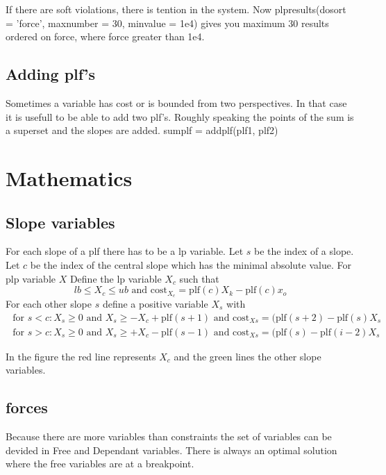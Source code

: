 \documentclass[]{article}
\newcommand{\for}[0]{\text{ for }}
\newcommand{\en}[0]{\text{ and }}
\newcommand{\cost}[0]{\text{cost}}
\newcommand{\plf}[0]{\text{plf}}
\begin{document}
If there are soft violations, there is tention in the system.
Now plpresults(dosort = 'force', maxnumber = 30, minvalue = 1e4)
gives you maximum 30 results ordered on force, where force greater than 1e4.


\subsection{Adding plf's}
Sometimes a variable has cost or is bounded from two perspectives. In that case it is usefull to be able to add two plf's. Roughly speaking the points of the sum is a superset and the slopes are added.
sumplf = addplf(plf1, plf2)

\newpage
\section{Mathematics}
\subsection{Slope variables}
For each slope of a plf there has to be a lp variable.
Let $s$ be the index of a slope.
Let $c$ be the index of the central slope which has the minimal absolute value.
For plp variable $X$ Define the lp variable $X_c$ such that
\[ lb \le X_c \le ub \en \cost_{X_c} = \plf(c) X_k - \plf(c) x_o\]
For each other slope $s$ define a positive variable $X_s$ with
\begin{align*}
 \for s < c : X_s \ge 0 \en  X_s \ge -X_c + \plf(s+1) \en \cost_{Xs} = (\plf(s+2)-\plf(s) X_s \\
 \for s > c : X_s \ge 0 \en  X_s \ge +X_c - \plf(s-1) \en \cost_{Xs} = (\plf(s)-\plf(i-2) X_s
\end{align*}
\begin{center}
\end{center}
In the figure the red line represents $X_c$ and the green lines the other slope variables.

\subsection{forces}
Because there are more variables than constraints
the set of variables can be devided in Free and Dependant variables.
There is always an optimal solution where the free variables are at a breakpoint.
\end{document}
